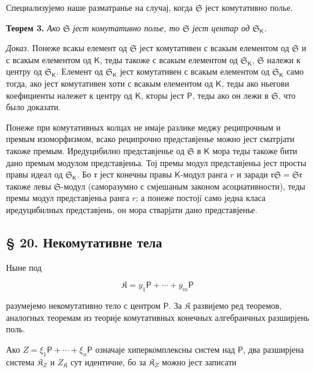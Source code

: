 \documentclass[11pt]{article}
\begin{document}
Специализујемо наше разматранье на случај, когда \(\mathfrak S\) јест комутативно полье.

\textbf{Теорем 3.} \emph{Ако \(\mathfrak S\) јест комутативно полье, то \(\mathfrak S\) јест центар од \(\mathfrak S_{\mathsf K}\).}

\emph{Доказ.} Понеже всакы елемент од \(\mathfrak S\) јест комутативен с всакым елементом од \(\mathfrak S\) и с всакым елементом од \(\mathsf K\), теды такоже с всакым елементом од \(\mathfrak S_{\mathsf K}\), \(\mathfrak S\) належи к центру од \(\mathfrak S_{\mathsf K}\). Елемент од \(\mathfrak S_{\mathsf K}\) јест комутативен с всакым елементом од \(\mathfrak S_{\mathsf K}\) само тогда, ако јест комутативен хоти с всакым елементом од \(\mathsf K\), теды ако ньегови коефициенты належет к центру од \(\mathsf K\), кторы јест \(\mathsf P\), теды ако он лежи в \(\mathfrak S\), что было доказати.

Понеже при комутативных колцах не имаје разлике меджу реципрочным и премым изоморфизмом, всако реципрочно представјенье можно јест сматрјати такоже премым. Иредуцибилно представјенье од \(\mathfrak S\) в \(\mathsf K\) мора теды такоже бити дано премым модулом представјеньа. Тој премы модул представјеньа јест просты правы идеал од \(\mathfrak S_{\mathsf K}\). Бо \(\mathfrak r\) јест конечны правы \(\mathsf K\)-модул ранга \(r\) и заради \(\mathfrak r\mathfrak S=\mathfrak S\mathfrak r\) такоже левы \(\mathfrak S\)-модул (саморазумно с смјешаным законом асоциативности), теды премы модул представјеньа ранга \(r\); а понеже постојí само једна класа иредуцибилных представјень, он мора стварјати дано представјенье.

\subsection*{§ 20. Некомутативне тела}\label{nichtkommutative-koerper}

Ныне под

\[
\mathfrak K=y_1\mathsf P+\cdots+y_m\mathsf P
\]

разумејемо некомутативно тело с центром \(\mathsf P\). За \(\mathfrak K\) развијемо ред теоремов, аналогных теоремам из теорије комутативных конечных алгебраичных разширјень поль.

Ако \(Z=\xi_1\mathsf P+\cdots+\xi_n\mathsf P\) означаје хиперкомплексны систем над \(\mathsf P\), два разширјена система \(\mathfrak K_Z\) и \(Z_{\mathfrak K}\) сут идентичне, бо за \(\mathfrak K_Z\) можно јест записати
\end{document}
